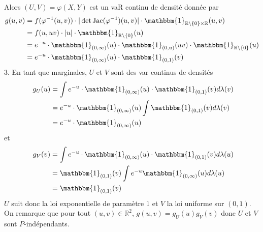 \documentclass{report}
\begin{document}
Alors $(U,V)=\varphi(X,Y)$ est un vaR continu de densité donnée par 
$$ \begin{aligned} g(u,v) &= f(\varphi^{-1}(u,v)) \cdot  |\det \operatorname{Jac}(\varphi^{-1})(u,v)| \cdot \mathbbm{1}_{\mathbb R\setminus \{0\} \times \mathbb R}(u,v)\\
&= f(u,uv) \cdot |u| \cdot \mathbbm{1}_{\mathbb R\setminus \{0\}}(u)\\
&=  e^{-u} \cdot \mathbbm{1}_{(0,\infty)}(u) \cdot \mathbbm{1}_{(0,u)}(uv) \cdot\mathbbm{1}_{\mathbb R\setminus \{0\}}(u) \\
&= e^{-u} \cdot \mathbbm{1}_{(0,\infty)}(u) \cdot \mathbbm{1}_{(0,1)}(v)
\end{aligned}$$
3. En tant que marginales, $U$ et $V$ sont des var continus de densités 
$$ \begin{aligned} g_U(u) &= \int e^{-u} \cdot \mathbbm{1}_{(0,\infty)}(u) \cdot \mathbbm{1}_{(0,1)}(v) d\lambda(v)\\
&= e^{-u} \cdot \mathbbm{1}_{(0,\infty)}(u) \int \mathbbm{1}_{(0,1)}(v) d\lambda(v) \\
&=e^{-u} \cdot \mathbbm{1}_{(0,\infty)}(u) 
\end{aligned}$$
et
$$ \begin{aligned} g_V(v) &= \int e^{-u} \cdot \mathbbm{1}_{(0,\infty)}(u) \cdot \mathbbm{1}_{(0,1)}(v) d\lambda(u)\\
&= \mathbbm{1}_{(0,1)}(v)  \int  e^{-u} \mathbbm{1}_{(0,\infty)}(u) d\lambda(u) \\
&= \mathbbm{1}_{(0,1)}(v)
\end{aligned}$$
$U$ suit donc la loi exponentielle de paramètre $1$ et $V$ la loi uniforme sur $(0,1)$. On remarque que pour tout $(u,v)\in \mathbb R^2$, $g(u,v) = g_U(u) g_V(v)$ donc $U$ et $V$ sont $P$-indépendants.
\end{document}
